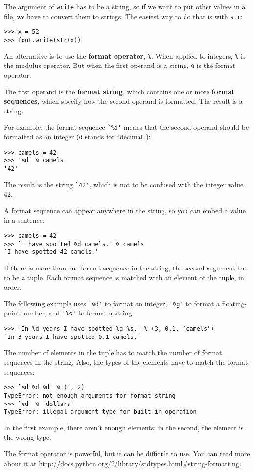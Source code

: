 \documentclass{article}
\begin{document}
\begin{multicols}{2}
The argument of \verb|write| has to be a string, so if we want to put other
values in a file, we have to convert them to strings. The easiest way
to do that is with \verb|str|:
\begin{lstlisting}
>>> x = 52
>>> fout.write(str(x))
\end{lstlisting}
An alternative is to use the \textbf{format operator}, \verb|%|.
When applied to integers, \verb|%| is the modulus operator.
But when the first operand is a string, \verb|%| is the format operator.
\par The first operand is the \textbf{format string},
which contains one or more
\textbf{format sequences}, which specify how the second operand is formatted.
The result is a string.
\par For example, the format sequence \verb|`%d'| means that the second operand
should be formatted as an integer (\verb|d| stands for ``decimal''):
\begin{lstlisting}
>>> camels = 42
>>> '%d' % camels
'42'
\end{lstlisting}
\par The result is the string \verb|`42'|,
which is not to be confused with the integer value 42.
\par A format sequence can appear anywhere in the string, so you can embed
a value in a sentence:
\begin{lstlisting}
>>> camels = 42
>>> `I have spotted %d camels.' % camels
`I have spotted 42 camels.'
\end{lstlisting}
\par If there is more than one format sequence in the string, the second
argument has to be a tuple. Each format sequence is matched with an
element of the tuple, in order.
\par The following example uses \verb|`%d'| to format an integer,
\verb|'%g'| to format a
floating-point number, and \verb|'%s'| to format a string:
\begin{lstlisting}
>>> `In %d years I have spotted %g %s.' % (3, 0.1, `camels')
`In 3 years I have spotted 0.1 camels.'
\end{lstlisting}
\par The number of elements in the tuple has to match the number of format
sequences in the string. Also, the types of the elements have to match
the format sequences:
\begin{lstlisting}
>>> `%d %d %d' % (1, 2)
TypeError: not enough arguments for format string
>>> `%d' % `dollars'
TypeError: illegal argument type for built-in operation
\end{lstlisting}
\par In the first example, there aren't enough elements; in the second,
the element is the wrong type.
\par The format operator is powerful, but it can be difficult to use. You
can read more about it at
\url{http://docs.python.org/2/library/stdtypes.html#string-formatting}.

\end{multicols}
\end{document}
